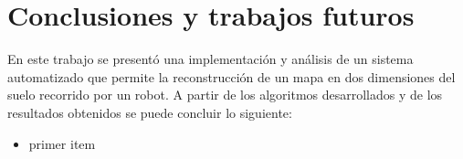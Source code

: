 \chapter{Conclusiones y trabajos futuros}
\label{capitulo6}

En este trabajo se presentó una implementación y análisis de un sistema automatizado que permite la reconstrucción de un mapa en dos dimensiones del suelo recorrido por un robot. A partir de los algoritmos desarrollados y de los resultados obtenidos se puede concluir lo siguiente:

\begin{itemize}
	\item primer item
\end{itemize}